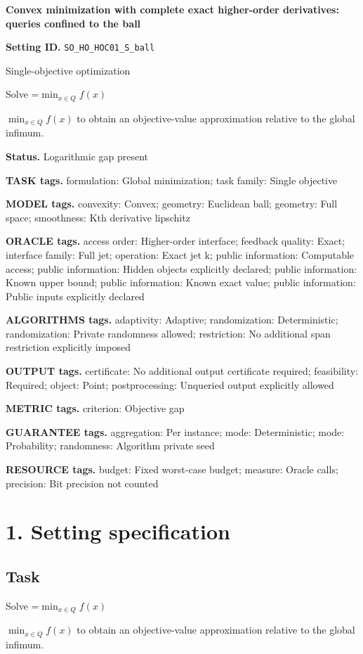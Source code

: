 \documentclass[10pt,a4paper]{article}
\newcommand{\AtlasMath}[1]{\par\begingroup\centering\setbox0=\hbox{$\displaystyle #1$}\ifdim\wd0>1.4\linewidth\typeout{ATLAS WIDE FORMULA: \the\wd0}\fi\ifdim\wd0>\linewidth\resizebox{\linewidth}{!}{\box0}\else\box0\fi\par\endgroup}
\newcommand{\AtlasInlineMath}[1]{\begingroup\setbox0=\hbox{$#1$}\ifdim\wd0>.4\linewidth\endgroup\AtlasMath{#1}\else\endgroup$#1$\fi}
\begin{document}
\raggedright

{\LARGE\bfseries\sffamily\color{AtlasNavy} Convex minimization with complete exact higher-order derivatives: queries confined to the ball\par}\vspace{5pt}
\textbf{Setting ID.} \texttt{SO\_\allowbreak{}HO\_\allowbreak{}HOC01\_\allowbreak{}S\_\allowbreak{}ball}

Single-objective optimization

Solve \AtlasInlineMath{\min_{x\in Q}f(x)} to obtain an objective-value approximation relative to the global infimum.

\textbf{Status.} Logarithmic gap present

\textbf{TASK tags.} formulation: Global minimization; task family: Single objective

\textbf{MODEL tags.} convexity: Convex; geometry: Euclidean ball; geometry: Full space; smoothness: Kth derivative lipschitz

\textbf{ORACLE tags.} access order: Higher-order interface; feedback quality: Exact; interface family: Full jet; operation: Exact jet k; public information: Computable access; public information: Hidden objects explicitly declared; public information: Known upper bound; public information: Known exact value; public information: Public inputs explicitly declared

\textbf{ALGORITHMS tags.} adaptivity: Adaptive; randomization: Deterministic; randomization: Private randomness allowed; restriction: No additional span restriction explicitly imposed

\textbf{OUTPUT tags.} certificate: No additional output certificate required; feasibility: Required; object: Point; postprocessing: Unqueried output explicitly allowed

\textbf{METRIC tags.} criterion: Objective gap

\textbf{GUARANTEE tags.} aggregation: Per instance; mode: Deterministic; mode: Probability; randomness: Algorithm private seed

\textbf{RESOURCE tags.} budget: Fixed worst-case budget; measure: Oracle calls; precision: Bit precision not counted

\section{1. Setting specification}
\subsection{Task}
Solve \AtlasInlineMath{\min_{x\in Q}f(x)} to obtain an objective-value approximation relative to the global infimum.
\end{document}
